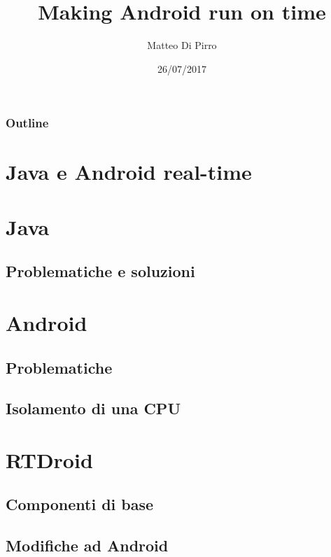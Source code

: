 \documentclass{beamer}
\title{Making Android run on time}
\subtitle{ }
\author{Matteo Di Pirro}
\date{26/07/2017}
\institute{Università degli Studi di Padova}
\begin{document}
\newcommand{\turnOffNumbers}{true} %

\begin{frame}[noframenumbering]
\titlepage
\end{frame}

\let\turnOffNumbers\empty
\begin{frame}
	\frametitle{Outline}
	\tableofcontents
\end{frame}

\section{Java e Android real-time}


\section{Java}
\subsection{Problematiche e soluzioni}



\section{Android}
\subsection{Problematiche}



\subsection{Isolamento di una CPU}




\section{RTDroid}

\subsection{Componenti di base}





\subsection{Modifiche ad Android}







\end{document}
